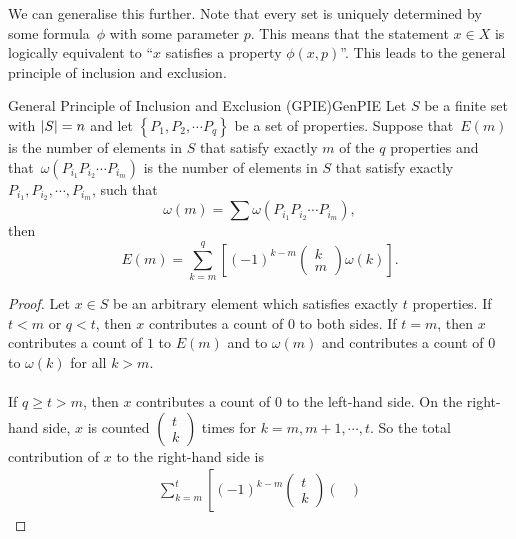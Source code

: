 \documentclass[math]{amznotes}
\theoremstyle{remark}
\newcommand{\0}{\mathbf{0}}
\newcommand{\1}{\mathbf{1}}
\begin{document}
We can generalise this further. Note that every set is uniquely determined by some formula~$\phi$ with some parameter $p$. This means that the statement $x \in X$ is logically equivalent to ``$x$ satisfies a property $\phi(x, p)$''. This leads to the general principle of inclusion and exclusion.
\begin{thmbox}{General Principle of Inclusion and Exclusion (GPIE)}{GenPIE}
    Let $S$ be a finite set with ${\left\lvert {S} \right\rvert} = n$ and let $\left\{P_1, P_2, \cdots P_q\right\}$ be a set of properties. Suppose that~$E(m)$ is the number of elements in $S$ that satisfy exactly $m$ of the $q$ properties and that~$\omega(P_{i_1}P_{i_2}\cdots P_{i_m})$ is the number of elements in $S$ that satisfy exactly $P_{i_1}, P_{i_2},\cdots, P_{i_m}$, such that
    \begin{equation*}
        \omega(m) = \sum \omega(P_{i_1}P_{i_2}\cdots P_{i_m}),
    \end{equation*}
    then
    \begin{equation*}
        E(m) = \sum_{k = m}^{q}\left[(-1)^{k - m}\begin{pmatrix}
            k \\
            m
        \end{pmatrix}\omega(k)\right].
    \end{equation*}
    \tcblower
    \begin{proof}
        Let $x \in S$ be an arbitrary element which satisfies exactly $t$ properties. If $t < m$ or $q < t$, then $x$ contributes a count of $0$ to both sides. If $t = m$, then $x$ contributes a count of $1$ to $E(m)$ and to $\omega(m)$ and contributes a count of $0$ to $\omega(k)$ for all $k > m$.
        \\\\
        If $q \geq t > m$, then $x$ contributes a count of $0$ to the left-hand side. On the right-hand side, $x$ is counted $\left(\begin{smallmatrix}
            t \\
            k
        \end{smallmatrix}\right)$ times for $k = m, m + 1, \cdots, t$. So the total contribution of $x$ to the right-hand side is
        \begin{align*}
            \sum_{k = m}^{t}\left[(-1)^{k - m}\begin{pmatrix}
                t \\
                k
            \end{pmatrix}\begin{pmatrix}

\end{pmatrix}
\end{align*}
\end{proof}
\end{thmbox}
\end{document}
